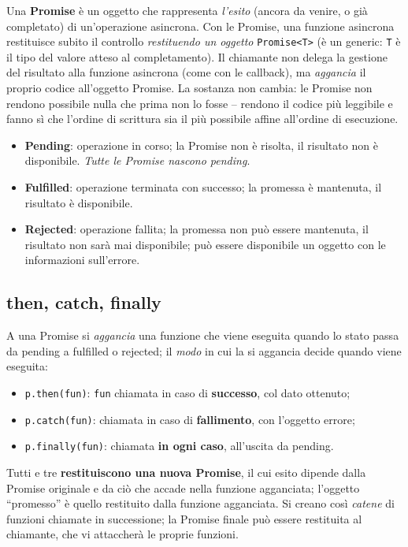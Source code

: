 \begin{definizione}[Promise]
Una \textbf{Promise} \`e un oggetto che rappresenta \emph{l'esito} (ancora da venire, o
gi\`a completato) di un'operazione asincrona. Con le Promise, una funzione asincrona
restituisce subito il controllo \emph{restituendo un oggetto} \texttt{Promise<T>}
(\`e un generic: \texttt{T} \`e il tipo del valore atteso al completamento). Il chiamante non
delega la gestione del risultato alla funzione asincrona (come con le callback), ma
\emph{aggancia} il proprio codice all'oggetto Promise. La sostanza non cambia: le Promise non
rendono possibile nulla che prima non lo fosse -- rendono il codice pi\`u leggibile e fanno
s\`i che l'ordine di scrittura sia il pi\`u possibile affine all'ordine di esecuzione.
\end{definizione}

\begin{importante}
\begin{itemize}
  \item \textbf{Pending}: operazione in corso; la Promise non \`e risolta, il risultato non
        \`e disponibile. \emph{Tutte le Promise nascono pending}.
  \item \textbf{Fulfilled}: operazione terminata con successo; la promessa \`e mantenuta,
        il risultato \`e disponibile.
  \item \textbf{Rejected}: operazione fallita; la promessa non pu\`o essere mantenuta, il
        risultato non sar\`a mai disponibile; pu\`o essere disponibile un oggetto con le
        informazioni sull'errore.
\end{itemize}
\end{importante}

\subsection{then, catch, finally}
A una Promise si \emph{aggancia} una funzione che viene eseguita quando lo stato passa da
pending a fulfilled o rejected; il \emph{modo} in cui la si aggancia decide quando viene
eseguita:
\begin{itemize}
  \item \texttt{p.then(fun)}: \texttt{fun} chiamata in caso di \textbf{successo}, col dato
        ottenuto;
  \item \texttt{p.catch(fun)}: chiamata in caso di \textbf{fallimento}, con l'oggetto errore;
  \item \texttt{p.finally(fun)}: chiamata \textbf{in ogni caso}, all'uscita da pending.
\end{itemize}
Tutti e tre \textbf{restituiscono una nuova Promise}, il cui esito dipende dalla Promise
originale e da ci\`o che accade nella funzione agganciata; l'oggetto ``promesso'' \`e quello
restituito dalla funzione agganciata. Si creano cos\`i \emph{catene} di funzioni chiamate in
successione; la Promise finale pu\`o essere restituita al chiamante, che vi attaccher\`a le
proprie funzioni.

